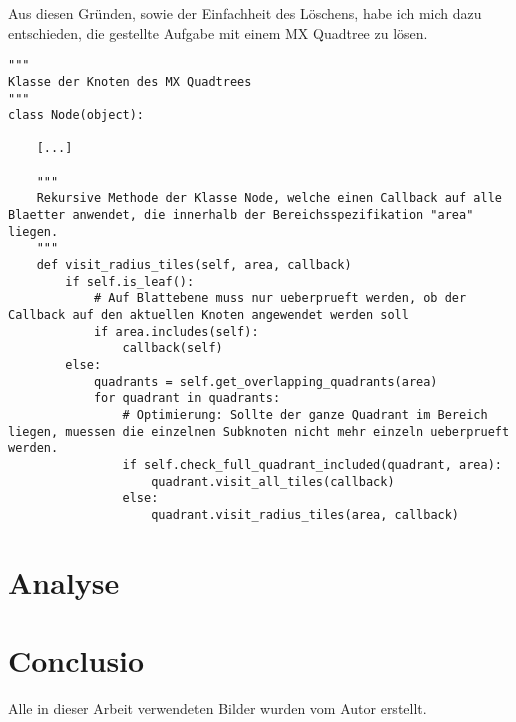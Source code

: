 \documentclass[%
			paper=a4,%
			DIV12,
			liststotoc,
			bibtotoc,
			draft=false,%
			titlepage
			]{scrartcl}
\begin{document}
Aus diesen Gründen, sowie der Einfachheit des Löschens, habe ich mich dazu entschieden, die gestellte Aufgabe mit einem MX Quadtree zu lösen.

\clearpage

\begin{lstlisting}[float,caption=Python-ähnlicher Pseudocode zur Lösung des Markierungsproblems]
"""
Klasse der Knoten des MX Quadtrees
"""
class Node(object):

	[...]

	"""
	Rekursive Methode der Klasse Node, welche einen Callback auf alle Blaetter anwendet, die innerhalb der Bereichsspezifikation "area" liegen.
	"""
	def visit_radius_tiles(self, area, callback)
		if self.is_leaf():
			# Auf Blattebene muss nur ueberprueft werden, ob der Callback auf den aktuellen Knoten angewendet werden soll
			if area.includes(self):
				callback(self)
		else:
			quadrants = self.get_overlapping_quadrants(area)
			for quadrant in quadrants:
				# Optimierung: Sollte der ganze Quadrant im Bereich liegen, muessen die einzelnen Subknoten nicht mehr einzeln ueberprueft werden.
				if self.check_full_quadrant_included(quadrant, area):
					quadrant.visit_all_tiles(callback)
				else:
					quadrant.visit_radius_tiles(area, callback)
\end{lstlisting}

\section{Analyse}

\section{Conclusio}

\newpage

\listoffigures

Alle in dieser Arbeit verwendeten Bilder wurden vom Autor erstellt.

\lstlistoflistings

\newpage

\nocite{*} %

\end{document}
